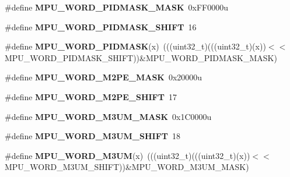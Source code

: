 \begin{DoxyCompactItemize}
\item 
\#define {\bfseries M\+P\+U\+\_\+\+W\+O\+R\+D\+\_\+\+P\+I\+D\+M\+A\+S\+K\+\_\+\+M\+A\+SK}~0x\+F\+F0000u\hypertarget{group__MPU__Register__Masks_ga2cf92c8c19cd17c1c81c8c9a56f112d7}{}\label{group__MPU__Register__Masks_ga2cf92c8c19cd17c1c81c8c9a56f112d7}

\item 
\#define {\bfseries M\+P\+U\+\_\+\+W\+O\+R\+D\+\_\+\+P\+I\+D\+M\+A\+S\+K\+\_\+\+S\+H\+I\+FT}~16\hypertarget{group__MPU__Register__Masks_ga8e8598cc55665f9c06a95b86700f7c59}{}\label{group__MPU__Register__Masks_ga8e8598cc55665f9c06a95b86700f7c59}

\item 
\#define {\bfseries M\+P\+U\+\_\+\+W\+O\+R\+D\+\_\+\+P\+I\+D\+M\+A\+SK}(x)~(((uint32\+\_\+t)(((uint32\+\_\+t)(x))$<$$<$M\+P\+U\+\_\+\+W\+O\+R\+D\+\_\+\+P\+I\+D\+M\+A\+S\+K\+\_\+\+S\+H\+I\+FT))\&M\+P\+U\+\_\+\+W\+O\+R\+D\+\_\+\+P\+I\+D\+M\+A\+S\+K\+\_\+\+M\+A\+SK)\hypertarget{group__MPU__Register__Masks_ga5cd1a6f78074f736b0c902acabbc2c2b}{}\label{group__MPU__Register__Masks_ga5cd1a6f78074f736b0c902acabbc2c2b}

\item 
\#define {\bfseries M\+P\+U\+\_\+\+W\+O\+R\+D\+\_\+\+M2\+P\+E\+\_\+\+M\+A\+SK}~0x20000u\hypertarget{group__MPU__Register__Masks_ga8b8927a9e9cd3cda870cec0d466f068b}{}\label{group__MPU__Register__Masks_ga8b8927a9e9cd3cda870cec0d466f068b}

\item 
\#define {\bfseries M\+P\+U\+\_\+\+W\+O\+R\+D\+\_\+\+M2\+P\+E\+\_\+\+S\+H\+I\+FT}~17\hypertarget{group__MPU__Register__Masks_ga36dd5e4e8ba83049c95bd912a2cf275f}{}\label{group__MPU__Register__Masks_ga36dd5e4e8ba83049c95bd912a2cf275f}

\item 
\#define {\bfseries M\+P\+U\+\_\+\+W\+O\+R\+D\+\_\+\+M3\+U\+M\+\_\+\+M\+A\+SK}~0x1\+C0000u\hypertarget{group__MPU__Register__Masks_gaaae46e6e46ff4089de2e00ef4f10396f}{}\label{group__MPU__Register__Masks_gaaae46e6e46ff4089de2e00ef4f10396f}

\item 
\#define {\bfseries M\+P\+U\+\_\+\+W\+O\+R\+D\+\_\+\+M3\+U\+M\+\_\+\+S\+H\+I\+FT}~18\hypertarget{group__MPU__Register__Masks_ga2256d09a97da4bc4e20aceefdd6870f1}{}\label{group__MPU__Register__Masks_ga2256d09a97da4bc4e20aceefdd6870f1}

\item 
\#define {\bfseries M\+P\+U\+\_\+\+W\+O\+R\+D\+\_\+\+M3\+UM}(x)~(((uint32\+\_\+t)(((uint32\+\_\+t)(x))$<$$<$M\+P\+U\+\_\+\+W\+O\+R\+D\+\_\+\+M3\+U\+M\+\_\+\+S\+H\+I\+FT))\&M\+P\+U\+\_\+\+W\+O\+R\+D\+\_\+\+M3\+U\+M\+\_\+\+M\+A\+SK)\hypertarget{group__MPU__Register__Masks_gaa96db29c2e34abb55632bbfdfe2bc998}{}\label{group__MPU__Register__Masks_gaa96db29c2e34abb55632bbfdfe2bc998}


\end{DoxyCompactItemize}
